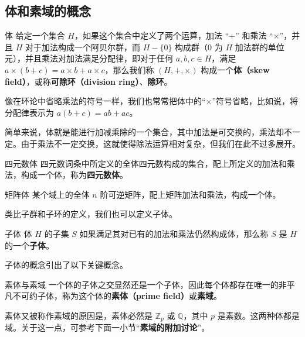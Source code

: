 \subsection{体和素域的概念}

\begin{definition}{体}\label{def_field_1}
给定一个集合 $H$，如果这个集合中定义了两个运算，加法 “+” 和乘法 “$\times$”，并且 $H$ 对于加法构成一个阿贝尔群，而 $H-\{0\}$ 构成群（$0$ 为 $H$ 加法群的单位元），并且乘法对加法满足分配律，即对于任何 $a, b, c\in H$，满足 $a\times(b+c)=a\times b+a\times c$，那么我们称 $(H, +, \times)$ 构成一个\textbf{体（skew field）}，或称\textbf{可除环（division ring）}、\textbf{除环}。
\end{definition}

像在环论中省略乘法的符号一样，我们也常常把体中的“$\times$”符号省略，比如说，将分配律表示为 $a(b+c)=ab+ac$。

简单来说，体就是能进行加减乘除的一个集合，其中加法是可交换的，乘法却不一定。由于乘法不一定交换，这就使得除法运算相对复杂，但我们在此不过多展开。

\begin{example}{四元数体}
四元数词条中所定义的全体四元数构成的集合，配上所定义的加法和乘法，构成一个体，称为\textbf{四元数体}。
\end{example}

\begin{example}{矩阵体}
某个域上的全体 $n$ 阶可逆矩阵，配上矩阵加法和乘法，构成一个体。
\end{example}

类比子群和子环的定义，我们也可以定义子体。

\begin{definition}{子体}
体 $H$ 的子集 $S$ 如果满足其对已有的加法和乘法仍然构成体，那么称 $S$ 是 $H$ 的一个\textbf{子体}。
\end{definition}
子体的概念引出了以下关键概念。
\begin{definition}{素体与素域}
一个体的子体之交显然还是一个子体，因此每个体都存在唯一的非平凡不可约子体，称为这个体的\textbf{素体（prime field）}或\textbf{素域}。
\end{definition}

素体又被称作素域的原因是，素体必然是 $\mathbb{Z}_p$ 或 $\mathbb{Q}$，其中 $p$ 是素数。这两种体都是域。关于这一点，可参考下面一小节“\textbf{素域的附加讨论}”。



